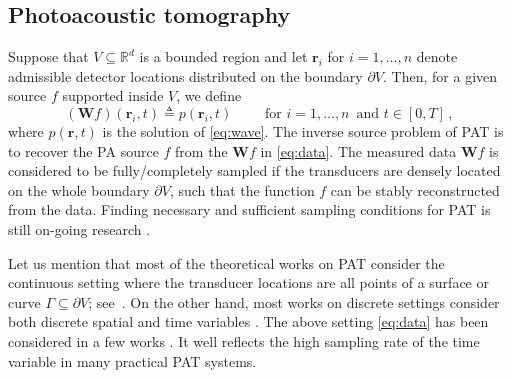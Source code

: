 \documentclass[11pt]{article}
\newcommand{\rr}{\mathbf r}
\newcommand{\source}{f}
\newcommand{\R}{\mathbb R}
\newcommand{\kl}[1]{(#1)}
\newcommand{\wave}{\mathbf W}
\begin{document}
\subsection{Photoacoustic tomography}

Suppose that $V \subseteq \R^d$ is a bounded region
and let $\rr_i$ for $i=1, \dots, n$ denote admissible
detector locations distributed on the  boundary $\partial V$.
Then, for a  given source $f$ supported inside $V$,
we define
\begin{equation} \label{eq:data}
(\wave \source) (\rr_i,  t) \triangleq p \kl{\rr_i, t}
\qquad \text{ for } i = 1, \dots, n \, \text{ and }t \in [0,T]  \,,
\end{equation}
where  $p(\rr,t)$ is the solution of \eqref{eq:wave}. The inverse source problem of PAT is to recover the PA source $\source$ from the $\wave \source$ in \eqref{eq:data}. The measured data $\wave \source$ is considered to be fully/completely sampled if the transducers are densely located on the whole boundary $\partial V$, such that the function $f$ can be stably reconstructed from the data. Finding necessary and sufficient sampling conditions for PAT is still on-going research \cite{haltmeier2016sampling}.

Let us mention that most of the theoretical works on PAT consider the continuous setting where the transducer locations are all points of a surface or curve $\Gamma \subseteq \partial V$;
see~\cite{FPR,XW05,Kun07,FHR,Kun07,IPI,Halt2d,Halt-Inv,natterer2012photo,Pal-Uniform,haltmeier2017analysis}. On the other hand, most works on discrete settings consider both discrete spatial and time variables \cite{huang2013full,haltmeier2016sampling}.  The above setting \eqref{eq:data} has been considered in a few works \cite{sandbichler2015novel,haltmeier2016compressed,chung2017motion}. It well  reflects the high sampling rate of the time variable in many practical PAT systems.

\end{document}
